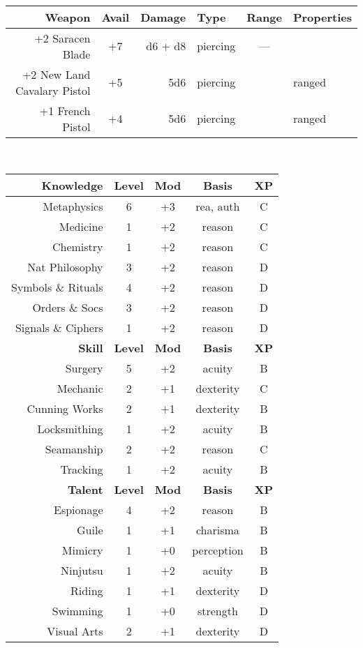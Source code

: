 \documentclass[11pt]{article}
\newcommand{\heading}[1]{{\sc\bfseries #1}}
\begin{document}
%
\\[8pt]
%
\noindent
\begin{tabular}[t]{|r|crl|c|l|}
\hline
\sc\bfseries Weapon
& \sc\bfseries Avail
& \sc\bfseries Damage
& \sc\bfseries Type
& \sc\bfseries Range
& \sc\bfseries Properties
\\ \hline\hline
+2 Saracen Blade & +7 & d6 + d8 & piercing & --- &
\\
+2 New Land Cavalary Pistol & +5 & 5d6 & piercing & & ranged
\\
+1 French Pistol & +4 & 5d6 & piercing &  & ranged
\\ \hline
\end{tabular}
%
\\[12pt]
%
\begin{tabular}[t]{|r|c|c|c|c|}
\hline
%
\heading{Knowledge} & \heading{Level} & \heading{Mod} & \heading{Basis} & \heading{XP}
\\ \hline \hline
\sc Metaphysics & 6 & +3 & rea, auth & C
\\
\sc Medicine & 1 & +2 & reason & C
\\
\sc Chemistry & 1 & +2 & reason & C
\\
\sc Nat Philosophy & 3 & +2 & reason & D
\\
\sc Symbols \& Rituals & 4 & +2 & reason & D
\\
\sc Orders \& Socs & 3 & +2 & reason & D
\\
\sc Signals \& Ciphers & 1 & +2 & reason & D
\\ \hline \hline
%
\heading{Skill} & \heading{Level} & \heading{Mod} & \heading{Basis} & \heading{XP}
\\ \hline \hline
\sc Surgery & 5 & +2 & acuity & B
\\
\sc Mechanic & 2 & +1 & dexterity & C
\\
\sc Cunning Works & 2 & +1 & dexterity & B
\\
\sc Locksmithing & 1 & +2 & acuity & B
\\
\sc Seamanship & 2 & +2 & reason & C
\\
\sc Tracking & 1 & +2 & acuity & B
\\ \hline \hline
%
\heading{Talent} & \heading{Level} & \heading{Mod} & \heading{Basis} & \heading{XP}
\\ \hline \hline
\sc Espionage & 4 & +2 & reason & B
\\
\sc Guile & 1 & +1 & charisma & B
\\
\sc Mimicry & 1 & +0 & perception & B
\\
\sc Ninjutsu & 1 & +2 & acuity & B
\\
\sc Riding & 1 & +1 & dexterity & D
\\
\sc Swimming & 1 & +0 & strength & D
\\
\sc Visual Arts & 2 & +1 & dexterity & D
\\ \hline
\end{tabular}
\end{document}
